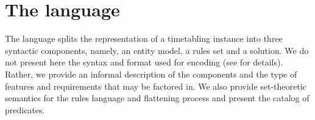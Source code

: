 \section{The {\UTP} language}
\label{sec:schema}
The {\UTP} language splits the representation of a timetabling instance into three syntactic components, namely, an entity model, a rules set and a solution. 
We do not present here the {\XML} syntax and {\JSON} format used for encoding (see \cite{USPsite} for details).
Rather, we provide an informal description of the components 
and the type of features and requirements that may be factored in.
We also provide set-theoretic semantics for the rules language and flattening process
and present the catalog of {\UTP} predicates.









